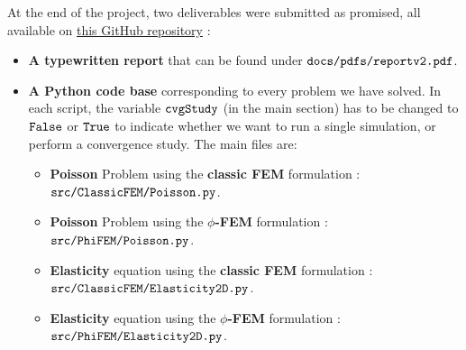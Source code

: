 At the end of the project, two deliverables were submitted as promised, all available on \href{https://github.com/master-csmi/2020-m2-mimesis}{this GitHub repository} :
\begin{itemize}
    \item \textbf{A typewritten report} that can be found under $\verb|docs/pdfs/reportv2.pdf|$.
    \item \textbf{A Python code base} corresponding to every problem we have solved. In each script, the variable  $\verb|cvgStudy|$ (in the main section) has to be changed to $\verb|False|$ or $\verb|True|$ to indicate whether we want to run a single simulation, or perform a convergence study. The main files are: \begin{itemize}
        \item \textbf{Poisson} Problem using the \textbf{classic FEM} formulation : $\verb|src/ClassicFEM/Poisson.py|$.
        \item \textbf{Poisson} Problem using the \textbf{$\phi$-FEM} formulation : $\verb|src/PhiFEM/Poisson.py|$.
        \item \textbf{Elasticity} equation using the \textbf{classic FEM} formulation : $\verb|src/ClassicFEM/Elasticity2D.py|$.
        \item \textbf{Elasticity} equation using the \textbf{$\phi$-FEM} formulation : $\verb|src/PhiFEM/Elasticity2D.py|$.
    \end{itemize}
\end{itemize} 
